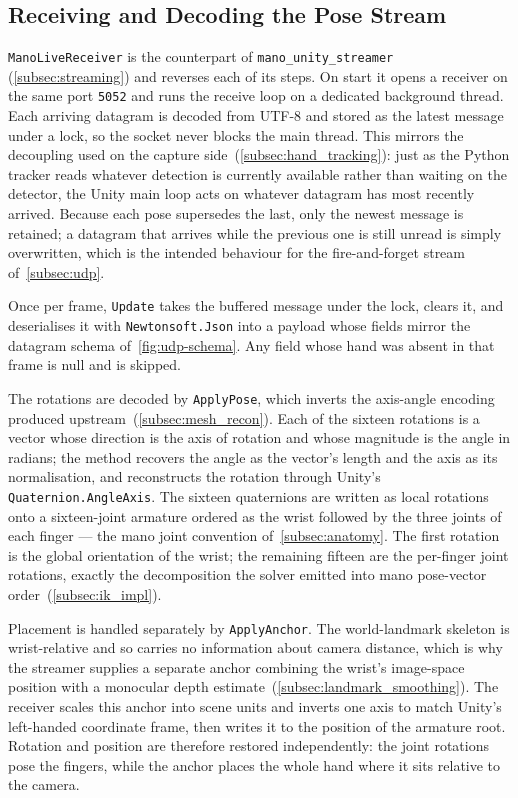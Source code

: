 \subsection{Receiving and Decoding the Pose Stream}\label{subsec:receiver}

\texttt{ManoLiveReceiver} is the counterpart of \texttt{mano\_unity\_streamer}
(\autoref{subsec:streaming}) and reverses each of its steps. On start it opens a
receiver on the same port \texttt{5052} and runs the receive loop on a dedicated
background thread. Each arriving datagram is decoded from UTF-8 and stored as the
latest message under a lock, so the socket never blocks the main thread. This
mirrors the decoupling used on the capture side~(\autoref{subsec:hand_tracking}):
just as the Python tracker reads whatever detection is currently available rather
than waiting on the detector, the Unity main loop acts on whatever datagram has
most recently arrived. Because each pose supersedes the last, only the newest
message is retained; a datagram that arrives while the previous one is still
unread is simply overwritten, which is the intended behaviour for the
fire-and-forget stream of~\autoref{subsec:udp}.

Once per frame, \texttt{Update} takes the buffered message under the lock, clears
it, and deserialises it with \texttt{Newtonsoft.Json} into a payload whose fields
mirror the datagram schema of~\autoref{fig:udp-schema}.
Any field whose hand was absent in that frame is null and is skipped.

The rotations are decoded by \texttt{ApplyPose}, which inverts the axis-angle
encoding produced upstream~(\autoref{subsec:mesh_recon}). Each of the sixteen
rotations is a vector whose direction is the axis of rotation and whose magnitude
is the angle in radians; the method recovers the angle as the vector's length and
the axis as its normalisation, and reconstructs the rotation through Unity's
\texttt{Quaternion.AngleAxis}. The sixteen quaternions are written as local
rotations onto a sixteen-joint armature ordered as the wrist followed by the three
joints of each finger --- the \acrshort{mano} joint convention
of~\autoref{subsec:anatomy}. The first rotation is the global orientation of the
wrist; the remaining fifteen are the per-finger joint rotations, exactly the
decomposition the solver emitted into \acrshort{mano} pose-vector
order~(\autoref{subsec:ik_impl}).

Placement is handled separately by \texttt{ApplyAnchor}. The world-landmark
skeleton is wrist-relative and so carries no information about camera distance,
which is why the streamer supplies a separate anchor combining the wrist's
image-space position with a monocular depth estimate~(\autoref{subsec:landmark_smoothing}).
The receiver scales this anchor into scene units and inverts one axis to match
Unity's left-handed coordinate frame, then writes it to the position of the
armature root. Rotation and position are therefore restored independently: the
joint rotations pose the fingers, while the anchor places the whole hand where it
sits relative to the camera.

